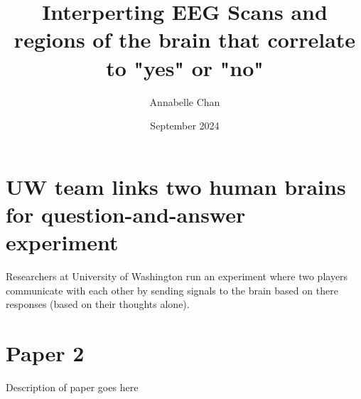 \documentclass[12pt]{article}
\title{Interperting EEG Scans and regions of the brain that correlate to "yes" or "no"}
\author{Annabelle Chan}
\date{September 2024}
\begin{document}
\maketitle

\section{UW team links two human brains for question-and-answer experiment}
Researchers at University of Washington run an experiment where two players communicate with each other by sending signals to the brain based on there responses (based on their thoughts alone).

\section{Paper 2}
Description of paper goes here
\end{document}
